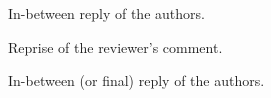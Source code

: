 %
\begin{AnswerInBetween}
In-between reply of the authors.
 \HardRevTask
\end{AnswerInBetween}
%
%
\begin{ReviewerCommentReprise}
Reprise of the reviewer's comment.
\end{ReviewerCommentReprise}
%
\begin{AnswerInBetween}
In-between (or final) reply of the authors.
 \RevTaskDone
\end{AnswerInBetween}
\\
\NotEstimatedRevTask \EasyRevTask \MediumRevTask \TimeConsumingRevTask \HardRevTask \DeathRevTask 
\\
\WorkInProgressRevTask \AlmostDoneRevTask \RevTaskDone
